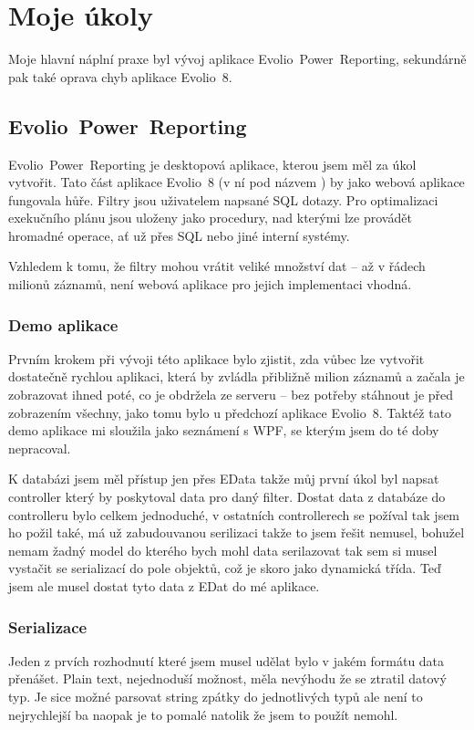 \documentclass[czech,bachelor,dept460,male,csharp]{diploma}
\newcommand{\EvolioEight}{Evolio~8}
\newcommand{\EFilters}{Evolio~Power~Reporting}
\newcommand{\EData}{EData}
\begin{document}
\section{Moje úkoly}
	Moje hlavní náplní praxe byl vývoj aplikace {\EFilters}, sekundárně pak také oprava chyb aplikace {\EvolioEight}.
	\subsection{\EFilters}
		{\EFilters} je desktopová aplikace, kterou jsem měl za úkol vytvořit. Tato část aplikace {\EvolioEight} (v ní pod názvem ) by jako webová aplikace fungovala hůře.
		Filtry jsou uživatelem napsané SQL dotazy. Pro optimalizaci exekučního plánu jsou uloženy jako procedury, nad kterými lze provádět hromadné operace, ať už přes SQL nebo jiné interní systémy.
		
		Vzhledem k tomu, že filtry mohou vrátit veliké množství dat – až v řádech milionů záznamů, není webová aplikace pro jejich implementaci vhodná.
		\subsubsection{Demo aplikace}
			Prvním krokem při vývoji této aplikace bylo zjistit, zda vůbec lze vytvořit dostatečně rychlou aplikaci, která by zvládla přibližně milion záznamů a začala je zobrazovat ihned poté, co je obdržela ze serveru – bez potřeby stáhnout je před zobrazením všechny, jako tomu bylo u předchozí aplikace {\EvolioEight}.
			Taktéž tato demo aplikace mi sloužila jako seznámení s WPF, se kterým jsem do té doby nepracoval.
			
			K databázi jsem měl přístup jen přes {\EData} takže můj první úkol byl napsat controller který by poskytoval data pro daný filter. Dostat data z databáze do controlleru bylo celkem jednoduché, v ostatních controllerech se požíval  tak jsem ho požil také, má už zabudouvanou serilizaci takže to jsem řešit nemusel, bohužel nemam žadný model do kterého bych mohl data serilazovat tak sem si musel vystačit se serializací do pole objektů, což je skoro jako dynamická třída. Teď jsem ale musel dostat tyto data z EDat do mé aplikace.
		\subsubsection{Serializace}
			Jeden z prvích rozhodnutí které jsem musel udělat bylo v jakém formátu data přenášet. Plain text, nejednoduší možnost, měla nevýhodu že se ztratil datový typ. Je sice možné parsovat string zpátky do jednotlivých typů ale není to nejrychlejší ba naopak je to pomalé natolik že jsem to použít nemohl.
			
\end{document}
